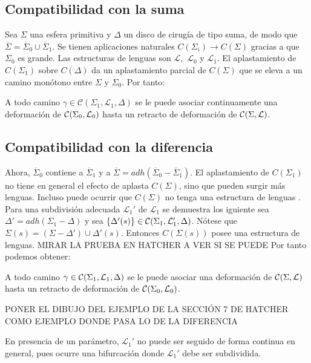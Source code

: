 \documentclass[twoside, 11pt]{article}
\newcommand{\LL}{\mathcal{L}}
\begin{document}
\subsection{Compatibilidad con la suma}

Sea $\Sigma$ una esfera primitiva y $\Delta$ un disco de cirugía de tipo suma, de modo que $\overline{\Sigma}=\overline{\Sigma}_0\cup\overline{\Sigma}_1$. Se tienen aplicaciones naturales $C(\Sigma_i)\to C(\Sigma)$ gracias a que $\Sigma_0$ es grande. Las estructuras de lenguas son $\LL,$ $\LL_0$ y $\LL_1$. El aplastamiento de $C(\Sigma_1)$ sobre $C(\Delta)$ da un aplastamiento parcial de $C(\Sigma)$ que se eleva a un camino monótono entre $\Sigma$ y $\Sigma_0$. Por tanto:
\begin{prop}
A todo camino $\gamma\in\mathcal{C}(\Sigma_1,\mathcal{L}_1,\Delta)$ se le puede asociar continuamente una deformación de $\CC(\Sigma_0,\LL_0)$ hasta un retracto de deformación de $\CC(\Sigma,\LL)$. 
\end{prop}

\subsection{Compatibilidad con la diferencia}

Ahora, $\overline{\Sigma}_0$ contiene a $\overline{\Sigma}_1$ y a $\overline{\Sigma}=adh(\overline{\Sigma}_0-\overline{\Sigma}_1)$. El aplastamiento de $C(\Sigma_1)$ no tiene en general el efecto de aplasta $C(\Sigma)$, sino que pueden surgir más lenguas. Incluso puede ocurrir que $C(\Sigma)$ no tenga una estructura de lenguas \cite[Sección 7]{Ha}. Para una subdivisión adecuada $\LL_1'$ de $\LL_1$ se demuestra los iguiente \cite[Secciones 10 y 11]{Ha} sea $\Delta'=adh(\Sigma_1-\Delta)$ y sea $\{\Delta'(s)\}\in\CC(\Sigma_1,\LL_1',\Delta)$. Nótese que $\Sigma(s)=(\Sigma-\Delta')\cup\Delta'(s)$. Entonces $C(\Sigma(s))$ posee una estructura de lenguas. MIRAR LA PRUEBA EN HATCHER A VER SI SE PUEDE Por tanto podemos obtener:
  \begin{prop}
  A todo camino $\gamma\in\CC(\Sigma_1,\LL_1,\Delta)$ se le puede asociar una deformación de $\CC(\Sigma,\LL)$ hasta un retracto de deformación de $\CC(\Sigma_0,\LL_0)$. 
  \end{prop}
  
  PONER EL DIBUJO DEL EJEMPLO DE LA SECCIÓN 7 DE HATCHER COMO EJEMPLO DONDE PASA LO DE LA DIFERENCIA
  
En presencia de un parámetro, $\LL_1'$ no puede ser seguido de forma continua en general, pues ocurre una bifurcación donde $\LL_1'$ debe ser subdividida. 
\end{document}

